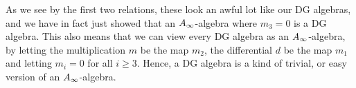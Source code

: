 As we see by the first two relations, these look an awful lot like our DG algebras, and we have in fact just showed that an $A_{\infty}$-algebra where $m_3 = 0$ is a DG algebra. This also means that we can view every DG algebra as an $A_{\infty}$-algebra, by letting the multiplication $m$ be the map $m_2$, the differential $d$ be the map $m_1$ and letting $m_i=0$ for all $i\geq 3$. Hence, a DG algebra is a kind of trivial, or easy version of an $A_{\infty}$-algebra. 



